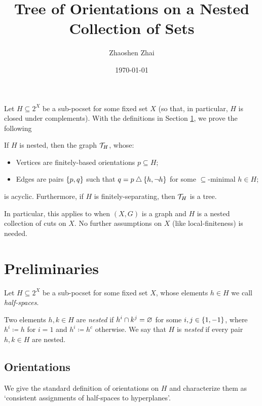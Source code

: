 \documentclass{amsart}
\begin{document}
    \title{Tree of Orientations on a Nested Collection of Sets}
    \author{Zhaoshen Zhai}
    \date{\today}
    \maketitle

    Let $H\subseteq2^X$ be a sub-pocset for some fixed set $X$ (so that, in particular, $H$ is closed under complements). With the definitions in Section \ref{prelim}, we prove the following
    \begin{mainTheorem}\label{main}
        If $H$ is nested, then the graph $\mc{T}_H$, whose:
        \begin{itemize}
            \item Vertices are finitely-based orientations $p\subseteq H$;
            \item Edges are pairs $\l\{p,q\r\}$ such that $q=p\symdiff\l\{h,\lnot h\r\}$ for some $\subseteq$-minimal $h\in H$;
        \end{itemize}
        is acyclic. Furthermore, if $H$ is finitely-separating, then $\mc{T}_H$ is a tree.
    \end{mainTheorem}

    In particular, this applies to when $(X,G)$ is a graph and $H$ is a nested collection of cuts on $X$. No further assumptions on $X$ (like local-finiteness) is needed.

    \section{Preliminaries}\label{prelim}

    Let $H\subseteq2^X$ be a sub-pocset for some fixed set $X$, whose elements $h\in H$ we call \textit{half-spaces}.

    \begin{definition}
        Two elements $h,k\in H$ are \textit{nested} if $h^i\cap k^j=\em$ for some $i,j\in\l\{1,-1\r\}$, where $h^i\coloneqq h$ for $i=1$ and $h^i\coloneqq h^c$ otherwise. We say that $H$ is \textit{nested} if every pair $h,k\in H$ are nested.
    \end{definition}

    \subsection{Orientations}

    We give the standard definition of orientations on $H$ and characterize them as `consistent assignments of half-spaces to hyperplanes'.
\end{document}
